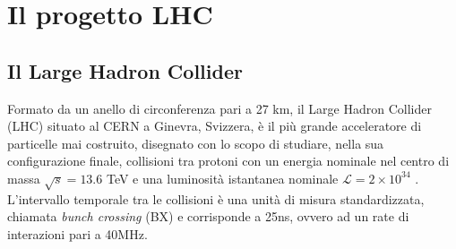 \chapter{Il progetto LHC}
\label{cap:PrimoCapitolo}

\sloppy
\section{Il Large Hadron Collider}
\label{sec:LHC}
Formato da un anello di circonferenza pari a 27 km, il Large Hadron Collider (LHC) situato al CERN a Ginevra, Svizzera, è il più grande acceleratore di particelle mai costruito, disegnato con lo scopo di studiare, nella sua configurazione finale, collisioni tra protoni con un energia nominale nel centro di massa $\sqrt{s} = 13.6$ TeV e una luminosità istantanea nominale $\mathcal{L} = 2 \times 10^{34}$ \Lumi. L'intervallo temporale tra le collisioni è una unità di misura standardizzata, chiamata \textit{bunch crossing} (BX) e corrisponde a 25ns, ovvero ad un rate di interazioni pari a 40MHz.

